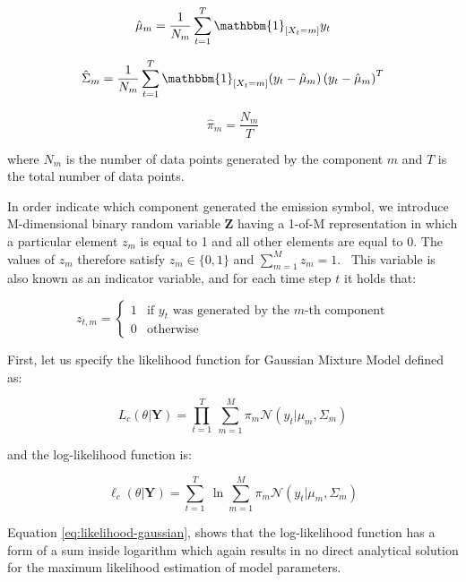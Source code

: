 \begin{equation}
    \hat{\mu}_m = \frac{1}{N_m} \sum_{t=1}^{T} \mathbbm{1}_{[X_t = m]} y_t
\end{equation}

\begin{equation}
    \hat{\Sigma}_m = \frac{1}{N_m} \sum_{t=1}^{T} \mathbbm{1}_{[X_t = m]} {\left(y_t - \hat{\mu}_m\right) \left(y_t - \hat{\mu}_m \right)}^T
\end{equation}

\begin{equation}
    \hat{\pi}_m = \frac{N_m}{T}
\end{equation}
    
\noindent where $N_m$ is the number of data points generated by the component $m$ and $T$ is the total number of data points. 

In order indicate which component generated the emission symbol, we introduce M-dimensional binary random variable $\textbf{Z}$ having a 1-of-M representation 
in which a particular element $z_m$ is equal to 1 and all other elements are equal to 0. The values of $z_m$ therefore satisfy $z_m \in \{0, 1\}$ and 
$\sum_{m=1}^{M} z_m = 1$.~\citep{Bishop2006} This variable is also known as an indicator variable, and for each time step $t$ it holds that:

\begin{equation}
    z_{t,m} = \begin{cases}
        1 & \text{if } y_t \text{ was generated by the } m\text{-th component} \\
        0 & \text{otherwise}
    \end{cases}
\end{equation}

\noindent First, let us specify the likelihood function for Gaussian Mixture Model defined as: 

\begin{equation} \label{eq:likelihood-gaussian}
    L_c(\theta|\textbf{Y}) = \prod_{t=1}^{T}\: \sum_{m=1}^{M} \pi_m \mathcal{N}(y_t|\mu_m,\Sigma_m)
\end{equation}

and the log-likelihood function is:

\begin{equation} \label{eq:loglikelihood-gaussian}
    \ell_c(\theta|\textbf{Y}) = \sum_{t=1}^{T}\: \ln \sum_{m=1}^{M} \pi_m \mathcal{N}(y_t|\mu_m,\Sigma_m)
\end{equation}

Equation \ref{eq:likelihood-gaussian}, shows that the log-likelihood function has a form of a sum inside logarithm which again results in no direct analytical solution for the maximum likelihood estimation of model parameters.

